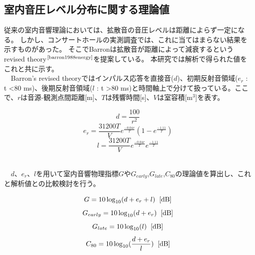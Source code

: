\subsection{室内音圧レベル分布に関する理論値}
従来の室内音響理論においては、拡散音の音圧レベルは距離によらず一定になる。
しかし、コンサートホールの実測調査では、これに当てはまらない結果を示すものがあった。
そこでBarronは拡散音が距離によって減衰するというrevised theory$^{\text{\cite{barron1988energy}}}$を提案している。
本研究では解析で得られた値をこれと共に示す。
\\　Barron's revised theoryではインパルス応答を直接音($d$)、初期反射音領域($e_r$ : t \textless 80 ms)、後期反射音領域($l$ : t \textgreater 80 ms)と時間軸上で分けて扱っている。ここで、$r$は音源-観測点間距離[m]、$T$は残響時間[s]、$V$は室容積[m$^3$]を表す。
\begin{table}[htbp]
    \begin{equation}
        \label{eq:d}
        d=\frac{100}{r^2}
    \end{equation}
    \begin{equation}
        e_r=\frac{31200T}{V}e^{\frac{-0.04r}{T}}(1-e^{\frac{-1.11}{T}})
    \end{equation}
    \begin{equation}
        l=\frac{31200T}{V}e^{\frac{-0.04r}{T}}e^{\frac{-1.11}{T}}
    \end{equation}
\end{table}
\\　$d$、$e_r$、$l$を用いて室内音響物理指標$G$や$G_{early}$,$G_{late}$,$C_{80}$の理論値を算出し、これと解析値との比較検討を行う。
\begin{table}[htbp]
    \begin{equation}
        G=10\log_{10}(d+e_r+l)\hspace{2mm}\textrm{[dB]}
    \end{equation}
    \begin{equation}
        G_{early}=10\log_{10}(d+e_r)\hspace{2mm}\textrm{[dB]}
    \end{equation}
    \begin{equation}
        G_{late}=10\log_{10}(l)\hspace{2mm}\textrm{[dB]}
    \end{equation}
    \begin{equation}
        C_{80}=10\log_{10}(\frac{d+e_r}{l})\hspace{2mm}\textrm{[dB]}
    \end{equation}

\end{table}